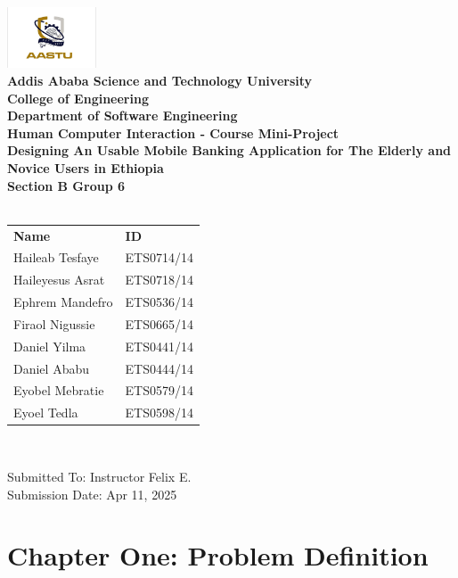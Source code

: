 \documentclass[a4paper,12pt]{report}
\begin{document}
\begin{titlepage}
  \centering
  \includegraphics[width=100px]{../shared/images/aastu_logo.png} \\
  {\large\bfseries Addis Ababa Science and Technology University} \\
  {\large\bfseries College of Engineering} \\
  {\large\bf Department of Software Engineering} \\[5mm]
  {\Large\bf Human Computer Interaction - Course Mini-Project} \\[5mm]
  {\Huge\bfseries Designing An Usable Mobile Banking Application for The Elderly and Novice Users in Ethiopia} \\ [2cm]
  {\Large\bfseries Section B Group 6 } \\[2mm]
  {\Large\bfseries{}} \\ [5mm]
  \begin{tabular}{ll}
    \large\textbf{Name}     & \large\textbf{ID} \\
    \large Haileab Tesfaye  & \large ETS0714/14 \\
    \large Haileyesus Asrat & \large ETS0718/14 \\
    \large Ephrem Mandefro  & \large ETS0536/14 \\
    \large Firaol Nigussie  & \large ETS0665/14 \\
    \large Daniel Yilma     & \large ETS0441/14 \\
    \large Daniel Ababu     & \large ETS0444/14 \\
    \large Eyobel Mebratie  & \large ETS0579/14 \\
    \large Eyoel Tedla      & \large ETS0598/14 \\
  \end{tabular} \\[4cm]

  \begin{flushright}
    {\large Submitted To: Instructor Felix E.}\\
    {\large Submission Date: Apr 11, 2025}
  \end{flushright}

\end{titlepage}
\tableofcontents
\chapter*{Chapter One: Problem Definition}
\setcounter{chapter}{1}
\setcounter{page}{1}
\end{document}
